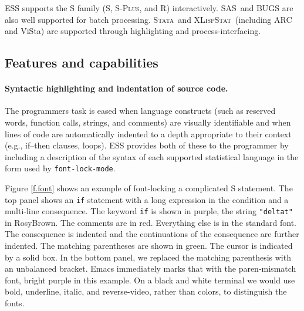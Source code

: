 \documentclass{article}
\newcommand*{\SAS}{\textsc{SAS}}
\newcommand*{\Splus}{\textsc{S-Plus}}
\newcommand*{\XLispStat}{\textsc{XLispStat}}
\newcommand*{\Stata}{\textsc{Stata}}
\newcommand{\stexttt}[1]{{\small\texttt{#1}}}
\begin{document}
ESS supports the S family (S, \Splus, and R) interactively.  \SAS\ and
BUGS are also well supported for batch processing.  \Stata\ and
\XLispStat\ (including ARC and ViSta) are supported through
highlighting and process-interfacing.

\subsection{Features and capabilities}
\label{sec:ESS:features}

\paragraph{Syntactic highlighting and indentation of source code.}
The programmers task is eased when language constructs (such as
reserved words, function calls, strings, and comments) are visually
identifiable and when lines of code are automatically indented to a
depth appropriate to their context (e.g., if--then clauses, loops).
ESS provides both of these to the programmer by including a
description of the syntax of each supported statistical language in
the form used by \stexttt{font-lock-mode}.

Figure \ref{f.font} shows an example of font-locking a complicated S
statement.  The top panel shows an \stexttt{if} statement with a long
expression in the condition and a multi-line consequence.  The keyword
\stexttt{if} is shown in purple, the string \stexttt{"deltat"} in
RosyBrown.  The comments are in red.  Everything else is in the
standard font.  The consequence is indented and the continuations of
the consequence are further indented.  The matching parentheses are
shown in green.  The cursor is indicated by a solid box.  In the
bottom panel, we replaced the matching parenthesis with an unbalanced
bracket.  Emacs immediately marks that with the paren-mismatch font,
bright purple in this example.  On a black and white terminal we would
use bold, underline, italic, and reverse-video, rather than colors, to
distinguish the fonts.

\end{document}
